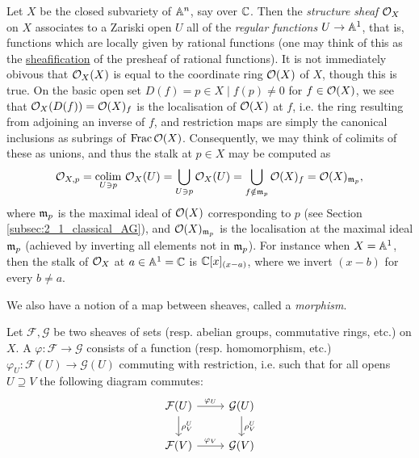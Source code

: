 \begin{eg}
	Let $X$ be the closed subvariety of $\mathbb{A}^n$, say over $\mathbb{C}$. Then the \emph{structure sheaf} $\mathcal{O}_X$ on $X$ associates to a Zariski open $U$ all of the \emph{regular functions} $U \to \mathbb{A}^1$, that is, functions which are locally given by rational functions (one may think of this as the \href{https://en.wikipedia.org/wiki/Sheaf_(mathematics)#Turning_a_presheaf_into_a_sheaf}{sheafification} of the presheaf of rational functions). It is not immediately obivous that $\mathcal{O}_X(X)$ is equal to the coordinate ring $\mathcal{O}(X)$ of $X$, though this is true. On the basic open set $D(f) = {p \in X \mid f(p) \neq 0}$ for $f \in \mathcal{O}(X)$, we see that $\mathcal{O}_X(D(f)) = \mathcal{O}(X)_f$ is the localisation of $\mathcal{O}(X)$ at $f$, i.e. the ring resulting from adjoining an inverse of $f$, and restriction maps are simply the canonical inclusions as subrings of $\mathrm{Frac}\,\mathcal{O}(X)$. Consequently, we may think of colimits of these as unions, and thus the stalk at $p\in X$ may be computed as
	\[
		\mathcal{O}_{X, p} = \mathop{\mathrm{colim}}\limits_{U \ni p} \, \mathcal{O}_X(U) = \bigcup_{U \ni p} \mathcal{O}_X(U) = \bigcup_{f \notin \mathfrak{m}_p} \mathcal{O}(X)_f = \mathcal{O}(X)_{\mathfrak{m}_p},
	\]
	where $\mathfrak{m}_p$ is the maximal ideal of $\mathcal{O}(X)$ corresponding to $p$ (see Section \ref{subsec:2_1_classical_AG}), and $\mathcal{O}(X)_{\mathfrak{m}_p}$ is the localisation at the maximal ideal $\mathfrak{m}_p$ (achieved by inverting all elements not in $\mathfrak{m}_p$). For instance when $X = \mathbb{A}^1$, then the stalk of $\mathcal{O}_X$ at $a \in \mathbb{A}^1 = \mathbb{C}$ is $\mathbb{C}[x]_{(x-a)}$, where we invert $(x-b)$ for every $b \neq a$.
\end{eg}

We also have a notion of a map between sheaves, called a \emph{morphism}.

\begin{defn}
	Let $\mathcal{F}, \mathcal{G}$ be two sheaves of sets (resp. abelian groups, commutative rings, etc.) on $X$. A  $\varphi : \mathcal{F} \to \mathcal{G}$ consists of a function (resp. homomorphism, etc.) $\varphi_U : \mathcal{F}(U) \to \mathcal{G}(U)$ commuting with restriction, i.e. such that for all opens $U \supseteq V$ the following diagram commutes:
	\[
		\begin{tikzcd}
			\mathcal{F}(U) \rar["\varphi_U"] \dar["\rho^U_V"] & \mathcal{G}(U) \dar["\rho^U_V"] \\
			\mathcal{F}(V) \rar["\varphi_V"] & \mathcal{G}(V)
		\end{tikzcd}
	\]
\end{defn}

